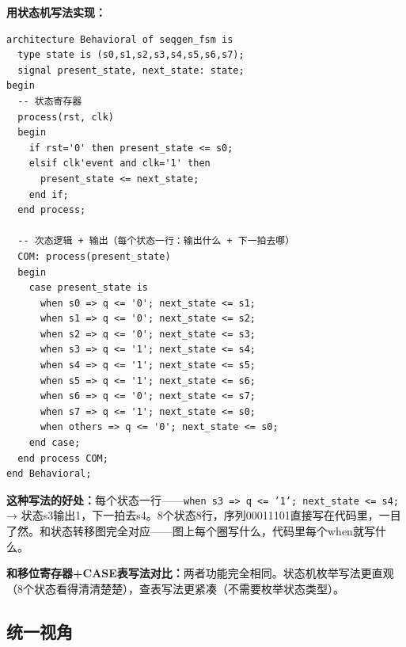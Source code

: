 \textbf{用状态机写法实现：}

\begin{lstlisting}[caption={序列发生器00011101——直观状态机写法}]
architecture Behavioral of seqgen_fsm is
  type state is (s0,s1,s2,s3,s4,s5,s6,s7);
  signal present_state, next_state: state;
begin
  -- 状态寄存器
  process(rst, clk)
  begin
    if rst='0' then present_state <= s0;
    elsif clk'event and clk='1' then
      present_state <= next_state;
    end if;
  end process;

  -- 次态逻辑 + 输出（每个状态一行：输出什么 + 下一拍去哪）
  COM: process(present_state)
  begin
    case present_state is
      when s0 => q <= '0'; next_state <= s1;
      when s1 => q <= '0'; next_state <= s2;
      when s2 => q <= '0'; next_state <= s3;
      when s3 => q <= '1'; next_state <= s4;
      when s4 => q <= '1'; next_state <= s5;
      when s5 => q <= '1'; next_state <= s6;
      when s6 => q <= '0'; next_state <= s7;
      when s7 => q <= '1'; next_state <= s0;
      when others => q <= '0'; next_state <= s0;
    end case;
  end process COM;
end Behavioral;
\end{lstlisting}

\textbf{这种写法的好处：}每个状态一行——\texttt{when s3 => q <= '1'; next\_state <= s4;} → 状态s3输出1，下一拍去s4。8个状态8行，序列00011101直接写在代码里，一目了然。和状态转移图完全对应——图上每个圈写什么，代码里每个when就写什么。

\textbf{和移位寄存器+CASE表写法对比：}两者功能完全相同。状态机枚举写法更直观（8个状态看得清清楚楚），查表写法更紧凑（不需要枚举状态类型）。

\subsection{统一视角}

\begin{center}
\end{center}

